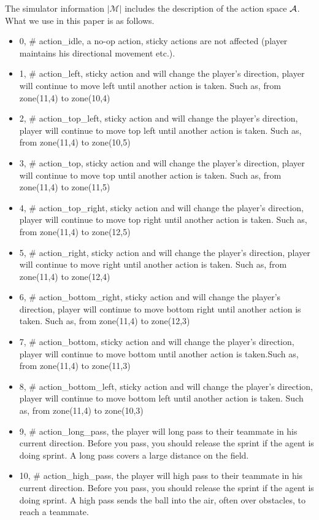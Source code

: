 The simulator information $|\mathcal{M}|$ includes the description of the action space ${\mathcal{A}}$. What we use in this paper is as follows.
\begin{itemize}
    \item 0, \# action\_idle, a no-op action, sticky actions are not affected (player maintains his directional movement etc.).
    \item 1, \# action\_left, sticky action and will change the player's direction, player will continue to move left until another action is taken. Such as, from zone(11,4) to zone(10,4)
    \item 2, \# action\_top\_left, sticky action and will change the player's direction, player will continue to move top left until another action is taken. Such as, from zone(11,4) to zone(10,5)
    \item 3, \# action\_top, sticky action and will change the player's direction, player will continue to move top until another action is taken. Such as, from zone(11,4) to zone(11,5)
    \item 4, \# action\_top\_right, sticky action and will change the player's direction, player will continue to move top right until another action is taken. Such as, from zone(11,4) to zone(12,5)
    \item 5, \# action\_right, sticky action and will change the player's direction, player will continue to move right until another action is taken. Such as, from zone(11,4) to zone(12,4)
    \item 6, \# action\_bottom\_right, sticky action and will change the player's direction, player will continue to move bottom right until another action is taken. Such as, from zone(11,4) to zone(12,3)
    \item 7, \# action\_bottom, sticky action and will change the player's direction, player will continue to move bottom until another action is taken.Such as, from zone(11,4) to zone(11,3)
    \item 8, \# action\_bottom\_left, sticky action and will change the player's direction, player will continue to move bottom left until another action is taken. Such as, from zone(11,4) to zone(10,3)
    \item 9, \# action\_long\_pass, the player will long pass to their teammate in his current direction. Before you pass, you should release the sprint if the agent is doing sprint. A long pass covers a large distance on the field. 
    \item 10, \# action\_high\_pass, the player will high pass to their teammate in his current direction. Before you pass, you should release the sprint if the agent is doing sprint. A high pass sends the ball into the air, often over obstacles, to reach a teammate.  

\end{itemize}
